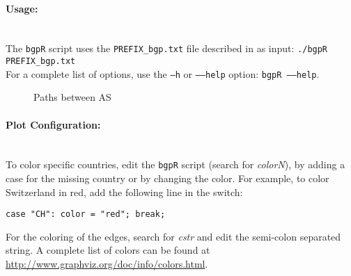 \documentclass[documentation]{subfiles}
\begin{document}
\paragraph{Usage:}~\\
The {\tt bgpR} script uses the {\tt PREFIX\_bgp.txt} file described in  as input: {\tt ./bgpR PREFIX\_bgp.txt}\\
For a complete list of options, use the {\tt --h} or {\tt --{}--help} option: {\tt bgpR --{}--help}.


\begin{figure}[!ht]
    \centering
    \caption{Paths between AS}
    \label{fig:bgpcn}
\end{figure}

\paragraph{Plot Configuration:}~\\
To color specific countries, edit the {\tt bgpR} script (search for {\em colorN}), by adding a case for the missing country or by changing the color. For example, to color Switzerland in red, add the following line in the switch:
\begin{lstlisting}
case "CH": color = "red"; break;
\end{lstlisting}
For the coloring of the edges, search for {\em cstr} and edit the semi-colon separated string.
A complete list of colors can be found at \url{http://www.graphviz.org/doc/info/colors.html}.
\end{document}
